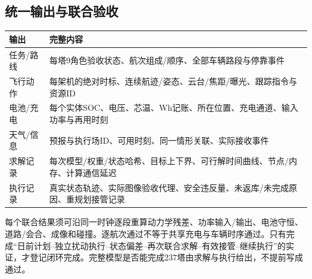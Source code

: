 \subsection*{统一输出与联合验收}
\begin{center}\small
\begin{tabular}{p{.23\linewidth}p{.67\linewidth}}\toprule
输出 & 完整内容\\\midrule
任务/路线 & 每塔9角色验收状态、航次组成/顺序、全部车辆路段与停靠事件\\
飞行动作 & 每架机的绝对时标、连续航迹/姿态、云台/焦距/曝光、跟踪指令与资源ID\\
电池/充电 & 每个实体SOC、电压、芯温、Wh记账、所在位置、充电通道、输入功率与再用时刻\\
天气/信息 & 预报与执行场ID、可用时刻、同一情形关联、实际接收事件\\
求解记录 & 每次模型/权重/状态哈希、目标上下界、可行解时间曲线、节点/内存、计算通信延迟\\
执行记录 & 真实状态轨迹、实际图像验收代理、安全违反量、未返库/未完成原因、重规划接管记录\\\bottomrule
\end{tabular}\end{center}
\noindent 每个联合结果须可沿同一时钟逐段重算动力学残差、功率输入/输出、电池守恒、道路/会合、成像和碰撞。逐航次通过不等于共享充电与车辆时序通过。只有完成“日前计划--独立扰动执行--状态偏差--再次联合求解--有效接管--继续执行”的实证，才登记闭环完成。完整模型是否能完成237塔由求解与执行给出，不提前写成通过。
\clearpage

